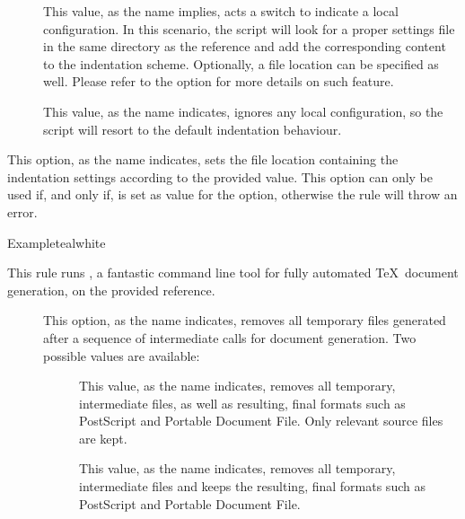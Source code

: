 \begin{description}
\begin{description}
\begin{description}
\item[] This value, as the name implies, acts a switch to indicate a local configuration. In this scenario, the script will look for a proper settings file in the same directory as the  reference and add the corresponding content to the indentation scheme. Optionally, a file location can be specified as well. Please refer to the  option for more details on such feature.

\item[] This value, as the name indicates, ignores any local configuration, so the script will resort to the default indentation behaviour.
\end{description}

\item[\abox{where}] This option, as the name indicates, sets the file location containing the indentation settings according to the provided value. This option can only be used if, and only if,  is set as value for the  option, otherwise the rule will throw an error.
\end{description}

\begin{codebox}{Example}{teal}{\icnote}{white}
\end{codebox}

\item[\rulebox{latexmk}{Marco Daniel, Brent Longborough, Paulo Cereda}] This rule runs , a fantastic command line tool for fully automated \TeX\ document generation, on the provided  reference.

\begin{description}
\item[] This option, as the name indicates, removes all temporary files generated after a sequence of intermediate calls for document generation. Two possible values are available:

\begin{description}
\item[] This value, as the name indicates, removes all temporary, intermediate files, as well as resulting, final formats such as PostScript and Portable Document File. Only relevant source files are kept.

\item[] This value, as the name indicates, removes all temporary, intermediate files and keeps the resulting, final formats such as PostScript and Portable Document File.
\end{description}


\end{description}
\end{description}
